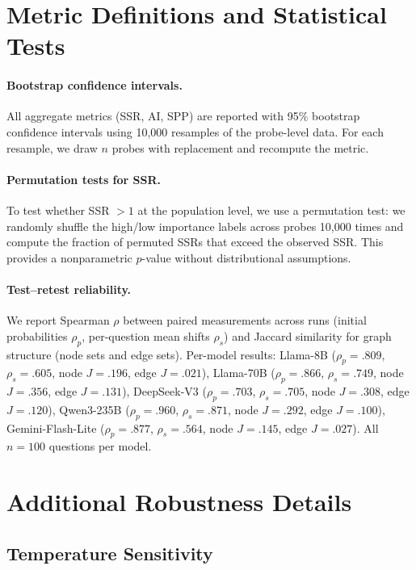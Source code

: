 \documentclass[11pt]{article}
\begin{document}
\section{Metric Definitions and Statistical Tests}
\label{app:metrics}

\paragraph{Bootstrap confidence intervals.} All aggregate metrics (SSR, AI, SPP) are reported with 95\% bootstrap confidence intervals using 10,000 resamples of the probe-level data. For each resample, we draw $n$ probes with replacement and recompute the metric.

\paragraph{Permutation tests for SSR.} To test whether SSR $> 1$ at the population level, we use a permutation test: we randomly shuffle the high/low importance labels across probes 10,000 times and compute the fraction of permuted SSRs that exceed the observed SSR. This provides a nonparametric $p$-value without distributional assumptions.

\paragraph{Test--retest reliability.} We report Spearman $\rho$ between paired measurements across runs (initial probabilities $\rho_p$, per-question mean shifts $\rho_s$) and Jaccard similarity for graph structure (node sets and edge sets). Per-model results: Llama-8B ($\rho_p = .809$, $\rho_s = .605$, node $J = .196$, edge $J = .021$), Llama-70B ($\rho_p = .866$, $\rho_s = .749$, node $J = .356$, edge $J = .131$), DeepSeek-V3 ($\rho_p = .703$, $\rho_s = .705$, node $J = .308$, edge $J = .120$), Qwen3-235B ($\rho_p = .960$, $\rho_s = .871$, node $J = .292$, edge $J = .100$), Gemini-Flash-Lite ($\rho_p = .877$, $\rho_s = .564$, node $J = .145$, edge $J = .027$). All $n = 100$ questions per model.

\section{Additional Robustness Details}
\label{app:robustness}

\subsection{Temperature Sensitivity}
\end{document}

